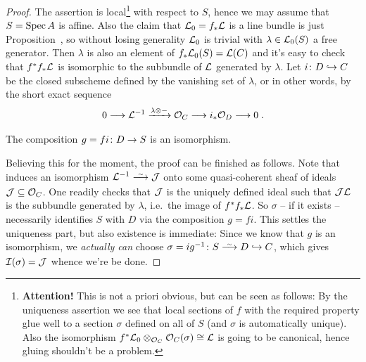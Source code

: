 \documentclass[a4paper,parskip=half,numbers=enddot, DIV=12]{scrreprt}
\begin{document}
\begin{proof}
	The assertion is local\footnote{\textbf{Attention!} This is not a priori obvious, but can be seen as follows: By the uniqueness assertion we see that local sections of $f$ with the required property glue well to a section $\sigma$ defined on all of $S$ (and $\sigma$ is automatically unique). Also the isomorphism $f^*\mathcal{L}_0\otimes_{\mathcal{O}_C}\mathcal{O}_C(\sigma)\cong\mathcal{L}$ is going to be canonical, hence gluing shouldn't be a problem.} with respect to $S$, hence we may assume that $S=\operatorname{Spec} A$ is affine. Also the claim that $\mathcal{L}_0=f_*\mathcal{L}$ is a line bundle is just Proposition~, so without losing generality $\mathcal{L}_0$ is trivial with $\lambda\in\mathcal{L}_0(S)$ a free generator. Then $\lambda$ is also an element of $f_*\mathcal{L}_0(S)=\mathcal{L}(C)$ and it's easy to check that $f^*f_*\mathcal{L}$ is isomorphic to the subbundle of $\mathcal{L}$ generated by $\lambda$. Let $i\colon D\monomorphism C$ be the closed subscheme defined by the vanishing set of $\lambda$, or in other words, by the short exact sequence
	\begin{align}\lbl{eq:SESforD}
		0\morphism\Ll^{-1}\xrightarrow{\lambda\otimes-}\Oo_C\morphism i_*\Oo_D\morphism 0\;.
	\end{align}
	\begin{claim}
		The composition $g=fi\colon D\morphism S$ is an isomorphism.
	\end{claim}
	Believing this for the moment, the proof can be finished as follows. Note that  induces an isomorphism $\Ll^{-1}\isomorphism\Jj$ onto some quasi-coherent sheaf of ideals $\mathcal{J}\subseteq \mathcal{O}_C$. One readily checks that $\mathcal{J}$ is the uniquely defined ideal such that $\mathcal{J}\mathcal{L}$ is the subbundle generated by $\lambda$, i.e.\ the image of $f^*f_*\mathcal{L}$. So $\sigma$ -- if it exists -- necessarily identifies $S$ with $D$ via the composition $g=fi$. This settles the uniqueness part, but also existence is immediate: Since we know that $g$ is an isomorphism, we \emph{actually can} choose $\sigma=ig^{-1}\colon S\isomorphism D\monomorphism C$, which gives $\mathcal{I}(\sigma)=\mathcal{J}$ whence we're be done.
	

\end{proof}
\end{document}
